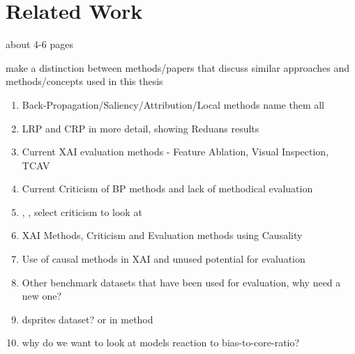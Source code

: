 
\chapter{Related Work}\label{chapter:related_work}


{\color{red}
      about 4-6 pages

      make a distinction between methods/papers that discuss similar approaches and methods/concepts used in this thesis}

\begin{enumerate}
      \item Back-Propagation/Saliency/Attribution/Local methods name them all
      \item LRP and CRP in more detail, showing Reduans results
      \item Current XAI evaluation methods - Feature Ablation, Visual Inspection, TCAV
      \item Current Criticism of BP methods and lack of methodical evaluation
      \item \cite{Sixt2020}, \cite{Wilming2023}, \cite{Kindermans2019} select criticism to look at
      \item XAI Methods, Criticism and Evaluation methods using Causality
      \item Use of causal methods in XAI and unused potential for evaluation
      \item Other benchmark datasets that have been used for evaluation, why need a new one?
      \item dsprites dataset? or in method
      \item why do we want to look at models reaction to bias-to-core-ratio?
\end{enumerate}


